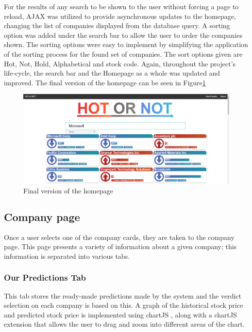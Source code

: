             For the results of any search to be shown to the user without forcing a page to reload, AJAX was utilized to provide asynchronous updates to the homepage, changing the list of companies displayed from the database query. A sorting option was added under the search bar to allow the user to order the companies shown. The sorting options were easy to implement by simplifying the application of the sorting process for the found set of companies. The sort options given are Hot, Not, Hold, Alphabetical and stock code. Again, throughout the project's life-cycle, the search bar and the Homepage as a whole was updated and improved. The final version of the homepage can be seen in Figure\ref{fig:Home_final}
            
            \begin{figure}[!h]
                \centering
                \includegraphics[width=0.9\linewidth]{images/upload/Homepage.PNG}
                \caption{Final version of the homepage}
                \label{fig:Home_final}
            \end{figure}
            
        
        \subsection{Company page}
        Once a user selects one of the company cards, they are taken to the company page. This page presents a variety of information about a given company; this information is separated into various tabs.
            
            \subsubsection{Our Predictions Tab}
            This tab stores the ready-made predictions made by the system and the verdict selection on each company is based on this. A graph of the historical stock price and predicted stock price is implemented using chartJS \citep{technology:Chartjs}, along with a chartJS extension that allows the user to drag and zoom into different areas of the chart.
            
